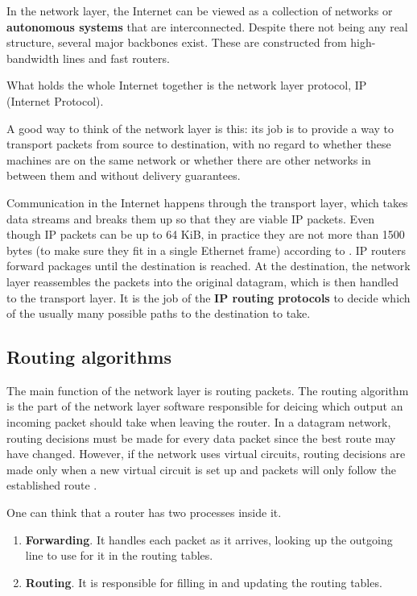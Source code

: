 \documentclass[12pt, oneside]{book}
\begin{document}
In the network layer, the Internet can be viewed as a collection of networks or \textbf{autonomous systems} that are interconnected. Despite there not being any real structure, several major backbones exist. These are constructed from high-bandwidth lines and fast routers.

What holds the whole Internet together is the network layer protocol, IP (Internet Protocol).

A good way to think of the network layer is this: its job is to provide a way to transport packets from source to destination, with no regard to whether these machines are on the same network or whether there are other networks in between them and without delivery guarantees. \cite{computer-networks-tanenbaum-2012}

Communication in the Internet happens through the transport layer, which takes data streams and breaks them up so that they are viable IP packets. Even though IP packets can be up to 64 KiB, in practice they are not more than 1500 bytes (to make sure they fit in a single Ethernet frame) according to \cite{computer-networks-tanenbaum-2012}.
IP routers forward packages until the destination is reached. At the destination, the network layer reassembles the packets into the original datagram, which is then handled to the transport layer.
It is the job of the \textbf{IP routing protocols} to decide which of the usually many possible paths to the destination to take.

\subsection{Routing algorithms}

The main function of the network layer is routing packets.
The routing algorithm is the part of the network layer software responsible for deicing which output an incoming packet should take when leaving the router.
In a datagram network, routing decisions must be made for every data packet since the best route may have changed.
However, if the network uses virtual circuits, routing decisions are made only when a new virtual circuit is set up and packets will only follow the established route \cite[p.~362]{computer-networks-tanenbaum-2012}.

One can think that a router has two processes inside it.

\begin{enumerate}
    \item \textbf{Forwarding}.
    It handles each packet as it arrives, looking up the outgoing line to use for it in the routing tables.
    \item \textbf{Routing}.
    It is responsible for filling in and updating the routing tables.
\end{enumerate}
\end{document}
